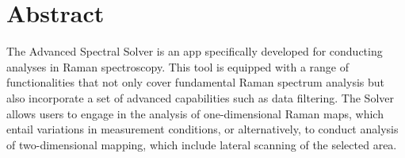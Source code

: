 \chapter*{Abstract}
\label{cha:Abstract}
The Advanced Spectral Solver is an app specifically developed for conducting analyses in Raman spectroscopy. This tool is equipped with a range of functionalities that not only cover fundamental Raman spectrum analysis but also incorporate a set of advanced capabilities such as data filtering. The Solver allows users to engage in the analysis of one-dimensional Raman maps, which entail variations in measurement conditions, or alternatively, to conduct analysis of two-dimensional mapping, which include lateral scanning of the selected area.

